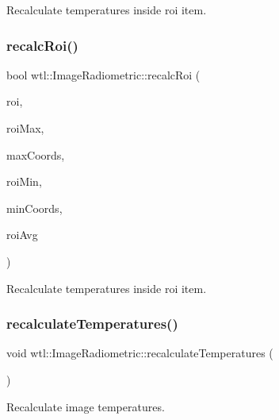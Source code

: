 Recalculate temperatures inside roi item. 

\mbox{\label{classwtl_1_1_image_radiometric_a7563fba10935fdf522f89e8a2b91688f}} 
\subsubsection{\texorpdfstring{recalc\+Roi()}{recalcRoi()}\hspace{0.1cm}{\footnotesize\ttfamily [2/2]}}
{\footnotesize\ttfamily bool wtl\+::\+Image\+Radiometric\+::recalc\+Roi (\begin{DoxyParamCaption}\item[{\hyperlink{structwtl_1_1_roi_struct}{Roi\+Struct} \&}]{roi,  }\item[{float \&}]{roi\+Max,  }\item[{std\+::pair$<$ int, int $>$ \&}]{max\+Coords,  }\item[{float \&}]{roi\+Min,  }\item[{std\+::pair$<$ int, int $>$ \&}]{min\+Coords,  }\item[{float \&}]{roi\+Avg }\end{DoxyParamCaption})}



Recalculate temperatures inside roi item. 

\mbox{\label{classwtl_1_1_image_radiometric_a0ebd547b95a0976e806bd55319127833}} 
\subsubsection{\texorpdfstring{recalculate\+Temperatures()}{recalculateTemperatures()}}
{\footnotesize\ttfamily void wtl\+::\+Image\+Radiometric\+::recalculate\+Temperatures (\begin{DoxyParamCaption}{ }\end{DoxyParamCaption})}



Recalculate image temperatures. 

